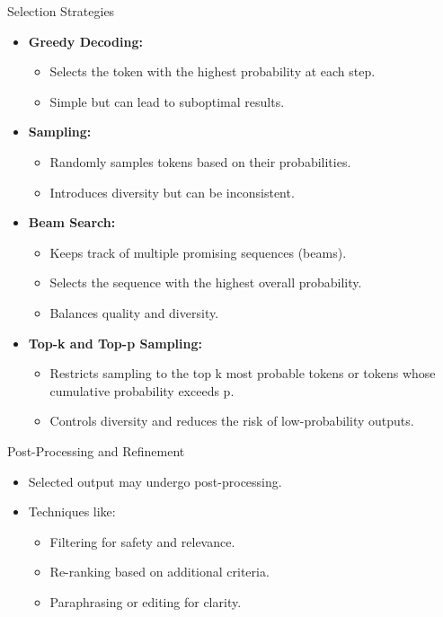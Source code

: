 \begin{frame}{Selection Strategies}
  \begin{itemize}
    \item \textbf{Greedy Decoding:}
      \begin{itemize}
        \item Selects the token with the highest probability at each step.
        \item Simple but can lead to suboptimal results.
      \end{itemize}
    \item \textbf{Sampling:}
      \begin{itemize}
        \item Randomly samples tokens based on their probabilities.
        \item Introduces diversity but can be inconsistent.
      \end{itemize}
    \item \textbf{Beam Search:}
      \begin{itemize}
        \item Keeps track of multiple promising sequences (beams).
        \item Selects the sequence with the highest overall probability.
        \item Balances quality and diversity.
      \end{itemize}
    \item \textbf{Top-k and Top-p Sampling:}
      \begin{itemize}
        \item Restricts sampling to the top k most probable tokens or tokens whose cumulative probability exceeds p.
        \item Controls diversity and reduces the risk of low-probability outputs.
      \end{itemize}
  \end{itemize}
\end{frame}

\begin{frame}{Post-Processing and Refinement}
  \begin{itemize}
    \item Selected output may undergo post-processing.
    \item Techniques like:
      \begin{itemize}
        \item Filtering for safety and relevance.
        \item Re-ranking based on additional criteria.
        \item Paraphrasing or editing for clarity.
      \end{itemize}
  \end{itemize}
\end{frame}

